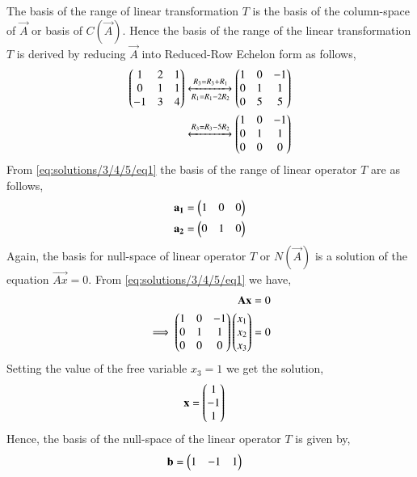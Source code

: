 The basis of the range of linear transformation $T$ is the basis of the column-space of $\vec{A}$ or basis of $C(\vec{A})$. Hence the basis of the range of the linear transformation $T$ is derived by reducing $\vec{A}$ into Reduced-Row Echelon form as follows,
\begin{align}
\begin{pmatrix}1&2&1\\0&1&1\\-1&3&4\end{pmatrix}&\xleftrightarrow[R_1=R_1-2R_2]{R_3=R_3+R_1}\begin{pmatrix}1&0&-1\\0&1&1\\0&5&5\end{pmatrix}\\
&\xleftrightarrow{R_3=R_3-5R_2}\begin{pmatrix}1&0&-1\\0&1&1\\0&0&0\end{pmatrix}
\label{eq:solutions/3/4/5/eq1}
\end{align}
From \eqref{eq:solutions/3/4/5/eq1} the basis of the range of linear operator $T$ are as follows,
\begin{align}
\mathbf{a_1} &= \begin{pmatrix}1&0&0\end{pmatrix}\\
\mathbf{a_2} &= \begin{pmatrix}0&1&0\end{pmatrix}
\end{align}
Again, the basis for null-space of linear operator $T$ or $N(\vec{A})$ is a solution of the equation $\vec{Ax} = 0$. From \eqref{eq:solutions/3/4/5/eq1} we have,
\begin{align}
\mathbf{Ax} &= 0\\
\implies\begin{pmatrix}1&0&-1\\0&1&1\\0&0&0\end{pmatrix}\begin{pmatrix}x_1\\x_2\\x_3\end{pmatrix} &= 0 
\label{eq:solutions/3/4/5/eq2}
\end{align}
Setting the value of the free variable $x_3 = 1$ we get the solution,
\begin{align}
\mathbf{x} &= \begin{pmatrix}1\\-1\\1\end{pmatrix}
\end{align}
Hence, the basis of the null-space of the linear operator $T$ is given by,
\begin{align}
\mathbf{b} &= \begin{pmatrix}1&-1&1\end{pmatrix}
\end{align}
